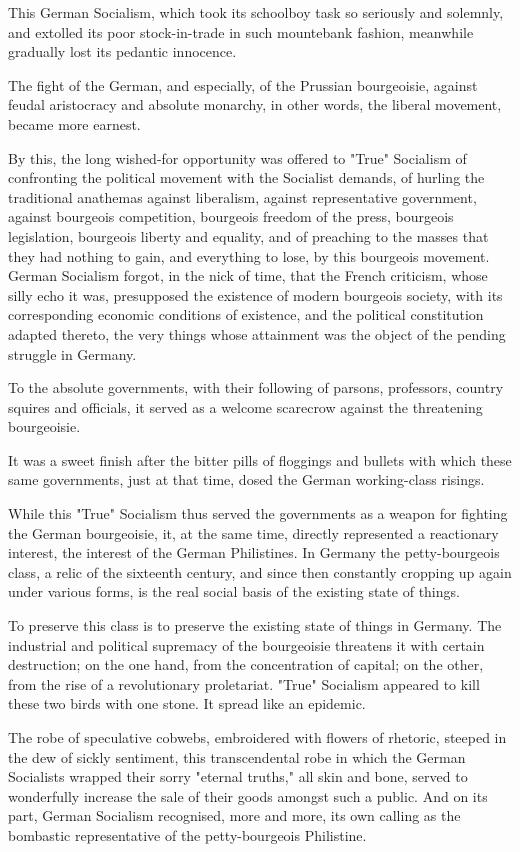 \documentclass[, oneside]{article}   	%
\begin{document}
This German Socialism, which took its schoolboy task so seriously and solemnly, and extolled its poor stock-in-trade in such mountebank fashion, meanwhile gradually lost its pedantic innocence.

The fight of the German, and especially, of the Prussian bourgeoisie, against feudal aristocracy and absolute monarchy, in other words, the liberal movement, became more earnest.

By this, the long wished-for opportunity was offered to "True" Socialism of confronting the political movement with the Socialist demands, of hurling the traditional anathemas against liberalism, against representative government, against bourgeois competition, bourgeois freedom of the press, bourgeois legislation, bourgeois liberty and equality, and of preaching to the masses that they had nothing to gain, and everything to lose, by this bourgeois movement. German Socialism forgot, in the nick of time, that the French criticism, whose silly echo it was, presupposed the existence of modern bourgeois society, with its corresponding economic conditions of existence, and the political constitution adapted thereto, the very things whose attainment was the object of the pending struggle in Germany.

To the absolute governments, with their following of parsons, professors, country squires and officials, it served as a welcome scarecrow against the threatening bourgeoisie.

It was a sweet finish after the bitter pills of floggings and bullets with which these same governments, just at that time, dosed the German working-class risings.

While this "True" Socialism thus served the governments as a weapon for fighting the German bourgeoisie, it, at the same time, directly represented a reactionary interest, the interest of the German Philistines. In Germany the petty-bourgeois class, a relic of the sixteenth century, and since then constantly cropping up again under various forms, is the real social basis of the existing state of things.

To preserve this class is to preserve the existing state of things in Germany. The industrial and political supremacy of the bourgeoisie threatens it with certain destruction; on the one hand, from the concentration of capital; on the other, from the rise of a revolutionary proletariat. "True" Socialism appeared to kill these two birds with one stone. It spread like an epidemic.

The robe of speculative cobwebs, embroidered with flowers of rhetoric, steeped in the dew of sickly sentiment, this transcendental robe in which the German Socialists wrapped their sorry "eternal truths," all skin and bone, served to wonderfully increase the sale of their goods amongst such a public. And on its part, German Socialism recognised, more and more, its own calling as the bombastic representative of the petty-bourgeois Philistine.
\end{document}
